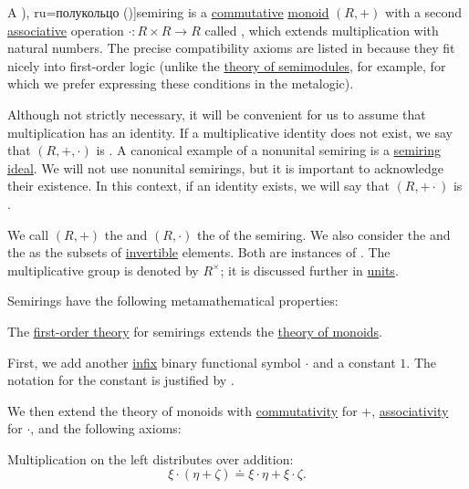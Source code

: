 \begin{definition}\label{def:semiring}
  A \term[ru=полупръстен (\cite[372]{ГеновМиховскиМоллов1991}), ru=полукольцо (\cite[4]{ВечтомовПетров2022})]{semiring} is a \hyperref[def:binary_operation/commutative]{commutative} \hyperref[def:monoid]{monoid} \( (R, +) \) with a second \hyperref[def:binary_operation/associative]{associative} operation \( \cdot: R \times R \to R \) called , which extends multiplication with natural numbers. The precise compatibility axioms are listed in  because they fit nicely into first-order logic (unlike the \hyperref[def:semimodule/theory]{theory of semimodules}, for example, for which we prefer expressing these conditions in the metalogic).

  Although not strictly necessary, it will be convenient for us to assume that multiplication has an identity. If a multiplicative identity does not exist, we say that \( (R, +, \cdot) \) is . A canonical example of a nonunital semiring is a \hyperref[def:semiring_ideal]{semiring ideal}. We will not use nonunital semirings, but it is important to acknowledge their existence. In this context, if an identity exists, we will say that \( (R, + \cdot) \) is .

  We call \( (R, +) \) the  and \( (R, \cdot) \) the  of the semiring. We also consider the  and the  as the subsets of \hyperref[def:monoid_inverse]{invertible} elements. Both are instances of . The multiplicative group is denoted by \( R^\times \); it is discussed further in \hyperref[def:divisibility/unit]{units}.

  Semirings have the following metamathematical properties:
  \begin{thmenum}
     The \hyperref[def:first_order_theory]{first-order theory} for semirings extends the \hyperref[def:monoid/theory]{theory of monoids}.

    First, we add another \hyperref[rem:first_order_formula_conventions/infix]{infix} binary functional symbol \( \cdot \) and a constant \( 1 \). The notation for the constant is justified by .

    We then extend the theory of monoids with \hyperref[def:binary_operation/commutative]{commutativity} for \( + \), \hyperref[def:binary_operation/associative]{associativity} for \( \cdot \), and the following axioms:
    \begin{thmenum}
       Multiplication on the left distributes over addition:
      \begin{equation}\label{eq:def:semiring/left_distributivity}
        \xi \cdot (\eta + \zeta) \doteq \xi \cdot \eta + \xi \cdot \zeta.
      \end{equation}


\end{thmenum}
\end{thmenum}
\end{definition}
